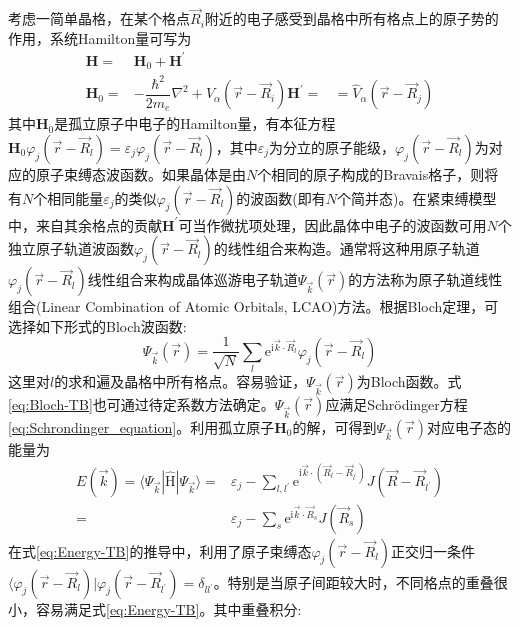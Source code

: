 考虑一简单晶格，在某个格点$\vec R_i$附近的电子感受到晶格中所有格点上的原子势的作用，系统Hamilton量可写为
\begin{equation}
	\begin{aligned}
		{\mathbf{H}}=&{\mathbf{H}}_0+{\mathbf{H}}^{\prime}\\
		{\mathbf{H}}_0=&-\dfrac{\hbar^2}{2m_e}\nabla^2+V_{\alpha}(\vec r-\vec R_i)
		{\mathbf{H}}^{\prime}=&=\hat{V}_{\alpha}(\vec r-\vec R_j)
	\end{aligned}
	\label{eq:Hamiltonian-tight-bondiing}
\end{equation}
其中${\mathbf{H}}_0$是孤立原子中电子的Hamilton量，有本征方程${\mathbf{H}}_0\varphi_j(\vec r-\vec R_l)=\varepsilon_j\varphi_j(\vec r-\vec R_l)$，其中$\varepsilon_j$为分立的原子能级，$\varphi_j(\vec r-\vec R_l)$为对应的原子束缚态波函数。如果晶体是由$N$个相同的原子构成的Bravais格子，则将有$N$个相同能量$\varepsilon_j$的类似$\varphi_j(\vec r-\vec R_l)$的波函数(即有$N$个简并态)。在紧束缚模型中，来自其余格点的贡献${\mathbf{H}}^{\prime}$可当作微扰项处理，因此晶体中电子的波函数可用$N$个独立原子轨道波函数$\varphi_j(\vec r-\vec R_l)$的线性组合来构造。通常将这种用原子轨道$\varphi_j(\vec r-\vec R_l)$线性组合来构成晶体巡游电子轨道$\Psi_{\vec k}(\vec r)$的方法称为原子轨道线性组合(Linear Combination of Atomic Orbitals, LCAO)方法。根据Bloch定理，可选择如下形式的Bloch波函数:
\begin{equation}
	\Psi_{\vec k}(\vec r)=\dfrac1{\sqrt N}\sum_l\mathrm{e}^{\mathrm{i}\vec k\cdot\vec R_l}\varphi_j(\vec r-\vec R_l)
	\label{eq:Bloch-TB}
\end{equation}
这里对$l$的求和遍及晶格中所有格点。容易验证，$\Psi_{\vec k}(\vec r)$为Bloch函数。式\eqref{eq:Bloch-TB}也可通过待定系数方法确定。$\Psi_{\vec k}(\vec r)$应满足Schr\"odinger方程\eqref{eq:Schrondinger_equation}。利用孤立原子${\mathbf{H}}_0$的解，可得到$\Psi_{\vec k}(\vec r)$对应电子态的能量为
\begin{equation}
	\begin{aligned}
		E(\vec k)=\langle\Psi_{\vec k}|\hat{\mathrm{H}}|\Psi_{\vec k}\rangle=&\varepsilon_j-\sum_{l,l^{\prime}}\mathrm{e}^{\mathrm{i}\vec k\cdot(\vec R_l-\vec R_{l^{\prime}})}J(\vec R-\vec R_{l^\prime})\\
		=&\varepsilon_j-\sum_s\mathrm{e}^{\mathrm{i}\vec k\cdot\vec R_s}J(\vec R_s)
	\end{aligned}
	\label{eq:Energy-TB}
\end{equation} 
在式\eqref{eq:Energy-TB}的推导中，利用了原子束缚态$\varphi_j(\vec r-\vec R_l)$正交归一条件$\langle\varphi_j(\vec r-\vec R_l)|\varphi_j(\vec r-\vec R_{l^{\prime}})=\delta_{ll^{\prime}}$。特别是当原子间距较大时，不同格点的重叠很小，容易满足式\eqref{eq:Energy-TB}。其中重叠积分:
